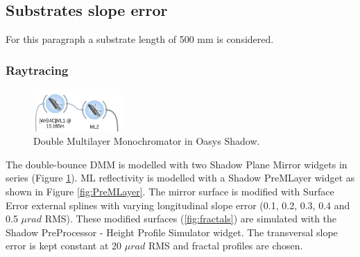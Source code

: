 \subsection{Substrates slope error}
For this paragraph a substrate length of 500 mm is considered.

\subsubsection{Raytracing}
\begin{figure}
\centering
\includegraphics[width=0.3\textwidth]{images/DMM_oasys.png}
\caption{\label{fig:DMM_oasys} Double Multilayer Monochromator in Oasys Shadow.}
\end{figure}

The double-bounce DMM is modelled with two Shadow Plane Mirror widgets in series (Figure \ref{fig:DMM_oasys}). ML reflectivity is modelled with a Shadow PreMLayer widget as shown in Figure \ref{fig:PreMLayer}. The mirror surface is modified with Surface Error external splines with varying longitudinal slope error (0.1, 0.2, 0.3, 0.4 and 0.5 $\mu rad$ RMS). These modified surfaces (\ref{fig:fractals}) are simulated with the Shadow PreProcessor - Height Profile Simulator widget. The transversal slope error is kept constant at 20 $\mu rad$ RMS and fractal profiles are chosen. 

